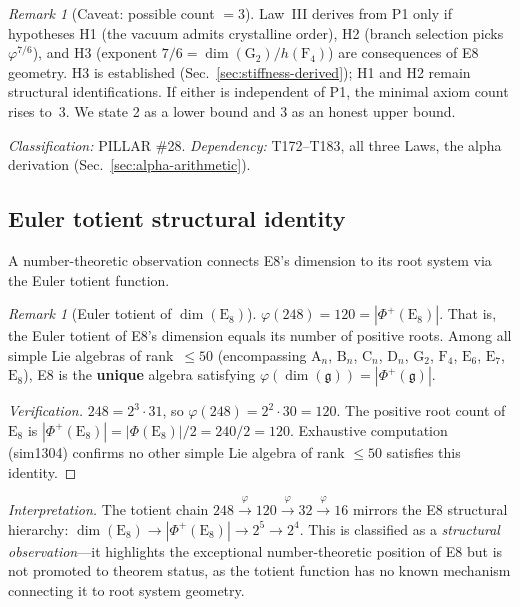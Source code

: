 \documentclass[aps,prd,twocolumn,superscriptaddress,floatfix,nofootinbib]{revtex4-2}
\theoremstyle{definition}
\theoremstyle{remark}
\newtheorem{remark}[theorem]{Remark}
\newcommand{\vp}{\varphi}
\begin{document}
\begin{remark}[Caveat: possible count $= 3$]
Law~III derives from P1 only if hypotheses H1 (the vacuum admits
crystalline order), H2 (branch selection picks $\vp^{7/6}$), and H3
(exponent $7/6 = \dim(\mathrm{G}_2)/h(\mathrm{F}_4)$) are consequences
of E8 geometry.  H3 is established (Sec.~\ref{sec:stiffness-derived}); H1
and H2 remain structural identifications.  If either is independent of
P1, the minimal axiom count rises to~3.  We state 2 as a lower bound and
3 as an honest upper bound.
\end{remark}

\noindent\textit{Classification:} PILLAR \#28.  \textit{Dependency:}
T172--T183, all three Laws, the alpha derivation (Sec.~\ref{sec:alpha-arithmetic}).

\subsection{Euler totient structural identity}
\label{sec:euler-totient}

A number-theoretic observation connects E8's dimension to its root system
via the Euler totient function.

\begin{remark}[Euler totient of $\dim(\mathrm{E}_8)$]
\label{rem:euler-totient-e8}
$\varphi(248) = 120 = |\Phi^+(\mathrm{E}_8)|$.  That is, the Euler
totient of E8's dimension equals its number of positive roots.
Among all simple Lie algebras of rank~$\le 50$ (encompassing
$\mathrm{A}_n$, $\mathrm{B}_n$, $\mathrm{C}_n$, $\mathrm{D}_n$,
$\mathrm{G}_2$, $\mathrm{F}_4$, $\mathrm{E}_6$, $\mathrm{E}_7$,
$\mathrm{E}_8$), E8 is the \textbf{unique} algebra satisfying
$\varphi(\dim(\mathfrak{g})) = |\Phi^+(\mathfrak{g})|$.
\end{remark}

\begin{proof}[Verification]
$248 = 2^3 \cdot 31$, so $\varphi(248) = 2^2 \cdot 30 = 120$.
The positive root count of $\mathrm{E}_8$ is
$|\Phi^+(\mathrm{E}_8)| = |\Phi(\mathrm{E}_8)|/2 = 240/2 = 120$.
Exhaustive computation (sim1304) confirms no other simple Lie algebra
of rank $\le 50$ satisfies this identity.
\end{proof}

\noindent\textit{Interpretation.}
The totient chain $248 \xrightarrow{\varphi} 120 \xrightarrow{\varphi}
32 \xrightarrow{\varphi} 16$ mirrors the E8 structural hierarchy:
$\dim(\mathrm{E}_8) \to |\Phi^+(\mathrm{E}_8)| \to 2^5 \to 2^4$.
This is classified as a \textit{structural observation}---it
highlights the exceptional number-theoretic position of E8 but is not
promoted to theorem status, as the totient function has no known
mechanism connecting it to root system geometry.
\end{document}
